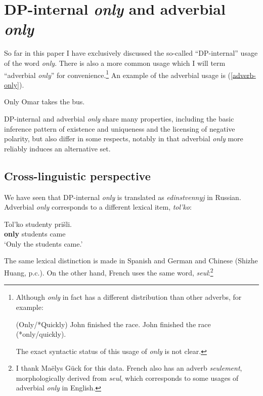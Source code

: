 \documentclass{article}
\begin{document}
\section{DP-internal \textit{only} and adverbial \textit{only} \label{sec:two-onlys}}
So far in this paper I have exclusively discussed the so-called ``DP-internal'' usage of the word \textit{only}. There is also a more common usage which I will term ``adverbial \textit{only}'' for convenience.\footnote{Although \textit{only} in fact has a different distribution than other adverbs, for example: \begin{exe} \ex (Only/*Quickly) John finished the race. \ex John finished the race (*only/quickly). \end{exe} The exact syntactic status of this usage of \textit{only} is not clear.} An example of the adverbial usage is (\ref{adverb-only}).

\begin{exe}
	\ex \label{adverb-only} Only Omar takes the bus.
\end{exe}

DP-internal and adverbial \textit{only} share many properties, including the basic inference pattern of existence and uniqueness and the licensing of negative polarity, but also differ in some respects, notably in that adverbial \textit{only} more reliably induces an alternative set.

\subsection{Cross-linguistic perspective}
We have seen that DP-internal \textit{only} is translated as \textit{edinstvennyj} in Russian. Adverbial \textit{only} corresponds to a different lexical item, \textit{tol'ko}:

\begin{exe}
	\ex \gll Tol'ko studenty pri\v{s}li.\\
	\textbf{only} students came\\
	\glt `Only the students came.'
\end{exe}

The same lexical distinction is made in Spanish and German \citep{mcnally08} and Chinese (Shizhe Huang, p.c.). On the other hand, French uses the same word, \textit{seul}:\footnote{I thank Ma\"{e}lys G\"{u}ck for this data. French also has an adverb \textit{seulement}, morphologically derived from \textit{seul}, which corresponds to some usages of adverbial \textit{only} in English.}
\end{document}
